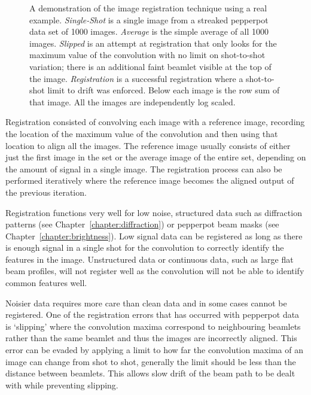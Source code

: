 \begin{figure}
    \center
    
    \caption[Realistic image registration example.]{A demonstration of the image registration technique using a real example. \emph{Single-Shot} is a single image from a streaked pepperpot data set of 1000 images. \emph{Average} is the simple average of all 1000 images. \emph{Slipped} is an attempt at registration that only looks for the maximum value of the convolution with no limit on shot-to-shot variation; there is an additional faint beamlet visible at the top of the image. \emph{Registration} is a successful registration where a shot-to-shot limit to drift was enforced. Below each image is the row sum of that image. All the images are independently log scaled.}
    \label{figure:real_registration_examples}
\end{figure}

Registration consisted of convolving each image with a reference image, recording the location of the maximum value of the convolution and then using that location to align all the images.
The reference image usually consists of either just the first image in the set or the average image of the entire set, depending on the amount of signal in a single image.
The registration process can also be performed iteratively where the reference image becomes the aligned output of the previous iteration.

Registration functions very well for low noise, structured data such as diffraction patterns (see Chapter~\ref{chapter:diffraction}) or pepperpot beam masks (see Chapter~\ref{chapter:brightness}).
Low signal data can be registered as long as there is enough signal in a single shot for the convolution to correctly identify the features in the image.
Unstructured data or continuous data, such as large flat beam profiles, will not register well as the convolution will not be able to identify common features well.

Noisier data requires more care than clean data and in some cases cannot be registered.
One of the registration errors that has occurred with pepperpot data is `slipping' where the convolution maxima correspond to neighbouring beamlets rather than the same beamlet and thus the images are incorrectly aligned.
This error can be evaded by applying a limit to how far the convolution maxima of an image can change from shot to shot, generally the limit should be less than the distance between beamlets.
This allows slow drift of the beam path to be dealt with while preventing slipping.

